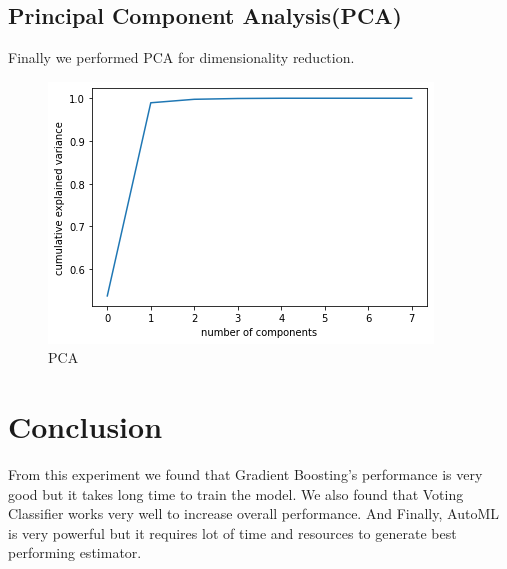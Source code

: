 \clearpage

\subsection{Principal Component Analysis(PCA)}
Finally we performed PCA for dimensionality reduction.
\begin{figure}[h]
\centering
\includegraphics[width=.92\linewidth]{pca}
\caption{PCA}%
\label{fig:pca}
\end{figure}


\section{Conclusion}
From this experiment we found that Gradient Boosting’s performance is very good but it takes long time to train the model. We also found that Voting Classifier works very well to increase overall performance. 
And Finally, AutoML is very powerful but it requires lot of time and resources to generate best performing estimator. 


